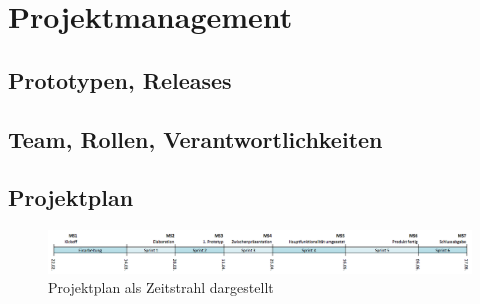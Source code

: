 \chapter{Projektmanagement}
\label{pm-projektmanagement}

\section{Prototypen, Releases}

\section{Team, Rollen, Verantwortlichkeiten}




\section{Projektplan}
\begin{figure}[H]
	\centering
	\includegraphics[width=\textwidth]{images/projektmanagement/zeitstrahl.png}
	\caption{Projektplan als Zeitstrahl dargestellt}
	\label{image-project-plan-timeline}
\end{figure}



